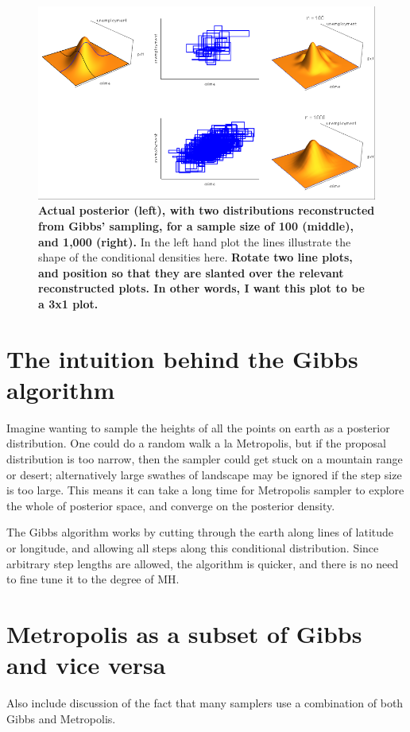 \documentclass[11pt,fullpage]{book}
\begin{document}
\begin{figure}
\centerline{\includegraphics[width=1\textwidth]{Gibbs_crimeMultivariateNormalSlice.png}}
\caption{\textbf{Actual posterior (left), with two distributions reconstructed from Gibbs' sampling, for a sample size of 100 (middle), and 1,000 (right).} In the left hand plot the lines illustrate the shape of the conditional densities here. \textbf{Rotate two line plots, and position so that they are slanted over the relevant reconstructed plots. In other words, I want this plot to be a 3x1 plot.}}\label{fig:Gibbs_crimeMultivariateNormalSlice}
\end{figure}

\section{The intuition behind the Gibbs algorithm}
Imagine wanting to sample the heights of all the points on earth as a posterior distribution. One could do a random walk a la Metropolis, but if the proposal distribution is too narrow, then the sampler could get stuck on a mountain range or desert; alternatively large swathes of landscape may be ignored if the step size is too large. This means it can take a long time for Metropolis sampler to explore the whole of posterior space, and converge on the posterior density. 

The Gibbs algorithm works by cutting through the earth along lines of latitude or longitude, and allowing all steps along this conditional distribution. Since arbitrary step lengths are allowed, the algorithm is quicker, and there is no need to fine tune it to the degree of MH.

\section{Metropolis as a subset of Gibbs and vice versa}
Also include discussion of the fact that many samplers use a combination of both Gibbs and Metropolis.
\end{document}
